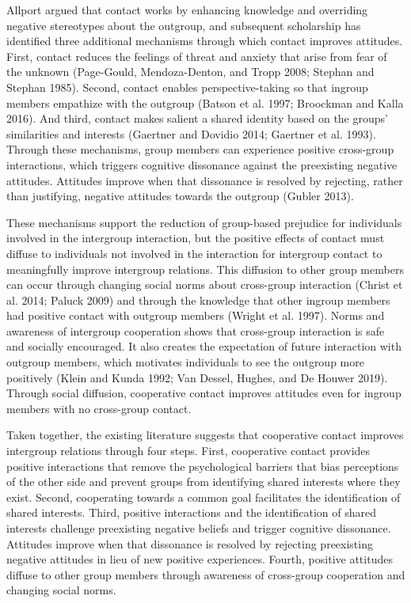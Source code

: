 \documentclass[11pt]{article}
\begin{document}
Allport argued that contact works by enhancing knowledge and overriding
negative stereotypes about the outgroup, and subsequent scholarship has
identified three additional mechanisms through which contact improves
attitudes. First, contact reduces the feelings of threat and anxiety
that arise from fear of the unknown (Page-Gould, Mendoza-Denton, and
Tropp 2008; Stephan and Stephan 1985). Second, contact enables
perspective-taking so that ingroup members empathize with the outgroup
(Batson et al. 1997; Broockman and Kalla 2016). And third, contact makes
salient a shared identity based on the groups' similarities and
interests (Gaertner and Dovidio 2014; Gaertner et al. 1993). Through
these mechanisms, group members can experience positive cross-group
interactions, which triggers cognitive dissonance against the
preexisting negative attitudes. Attitudes improve when that dissonance
is resolved by rejecting, rather than justifying, negative attitudes
towards the outgroup (Gubler 2013).

These mechanisms support the reduction of group-based prejudice for
individuals involved in the intergroup interaction, but the positive
effects of contact must diffuse to individuals not involved in the
interaction for intergroup contact to meaningfully improve intergroup
relations. This diffusion to other group members can occur through
changing social norms about cross-group interaction (Christ et al. 2014;
Paluck 2009) and through the knowledge that other ingroup members had
positive contact with outgroup members (Wright et al. 1997). Norms and
awareness of intergroup cooperation shows that cross-group interaction
is safe and socially encouraged. It also creates the expectation of
future interaction with outgroup members, which motivates individuals to
see the outgroup more positively (Klein and Kunda 1992; Van Dessel,
Hughes, and De Houwer 2019). Through social diffusion, cooperative
contact improves attitudes even for ingroup members with no cross-group
contact.

Taken together, the existing literature suggests that cooperative
contact improves intergroup relations through four steps. First,
cooperative contact provides positive interactions that remove the
psychological barriers that bias perceptions of the other side and
prevent groups from identifying shared interests where they exist.
Second, cooperating towards a common goal facilitates the identification
of shared interests. Third, positive interactions and the identification
of shared interests challenge preexisting negative beliefs and trigger
cognitive dissonance. Attitudes improve when that dissonance is resolved
by rejecting preexisting negative attitudes in lieu of new positive
experiences. Fourth, positive attitudes diffuse to other group members
through awareness of cross-group cooperation and changing social norms.
\end{document}
